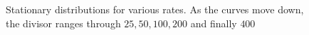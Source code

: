 \documentclass[a4paper,12pt,reqno,superscriptaddress,nofootinbib]{revtex4}
\theoremstyle{plain}
\theoremstyle{definition}
\theoremstyle{remark}
\newcommand{\0}{^{(0)}}
\newcommand{\1}{^{(1)}}
\newcommand{\2}{^{(2)}}
\begin{document}
\begin{figure}
	\hfill%
	\hfill%
	\caption{Stationary distributions for various rates. As the curves move down, the divisor ranges through $25,50,100,200$ and finally $400$}\label{fig:exploration}
\end{figure}
\end{document}
